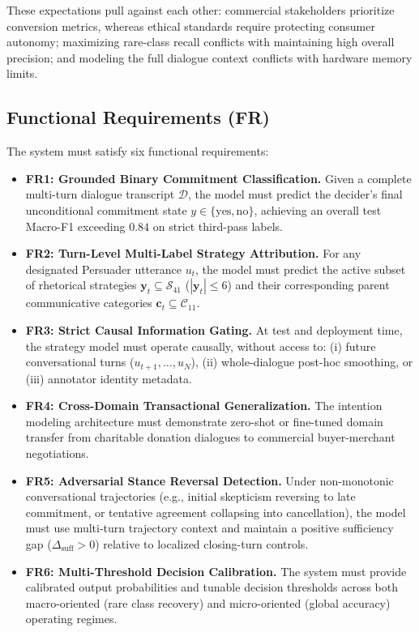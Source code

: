 These expectations pull against each other: commercial stakeholders prioritize conversion metrics, whereas ethical standards require protecting consumer autonomy; maximizing rare-class recall conflicts with maintaining high overall precision; and modeling the full dialogue context conflicts with hardware memory limits.

\subsection{Functional Requirements (FR)}
The system must satisfy six functional requirements:
\begin{itemize}
  \item \textbf{FR1: Grounded Binary Commitment Classification.} Given a complete multi-turn dialogue transcript $\mathcal{D}$, the model must predict the decider's final unconditional commitment state $y \in \{\text{yes}, \text{no}\}$, achieving an overall test Macro-F1 exceeding $0.84$ on strict third-pass labels.
  \item \textbf{FR2: Turn-Level Multi-Label Strategy Attribution.} For any designated Persuader utterance $u_t$, the model must predict the active subset of rhetorical strategies $\mathbf{y}_t \subseteq \mathcal{S}_{41}$ ($|\mathbf{y}_t| \le 6$) and their corresponding parent communicative categories $\mathbf{c}_t \subseteq \mathcal{C}_{11}$.
  \item \textbf{FR3: Strict Causal Information Gating.} At test and deployment time, the strategy model must operate causally, without access to: (i) future conversational turns ($u_{t+1}, \dots, u_N$), (ii) whole-dialogue post-hoc smoothing, or (iii) annotator identity metadata.
  \item \textbf{FR4: Cross-Domain Transactional Generalization.} The intention modeling architecture must demonstrate zero-shot or fine-tuned domain transfer from charitable donation dialogues to commercial buyer-merchant negotiations.
  \item \textbf{FR5: Adversarial Stance Reversal Detection.} Under non-monotonic conversational trajectories (e.g., initial skepticism reversing to late commitment, or tentative agreement collapsing into cancellation), the model must use multi-turn trajectory context and maintain a positive sufficiency gap ($\Delta_{\text{suff}} > 0$) relative to localized closing-turn controls.
  \item \textbf{FR6: Multi-Threshold Decision Calibration.} The system must provide calibrated output probabilities and tunable decision thresholds across both macro-oriented (rare class recovery) and micro-oriented (global accuracy) operating regimes.
\end{itemize}

